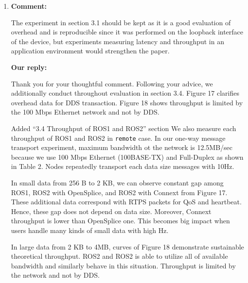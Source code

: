 \documentclass{article}
\begin{document}
\begin{enumerate}
\item \begin{flushleft}
    \textbf{Comment:}
  \end{flushleft}
  The experiment in section 3.1 should be kept as it is a good evaluation of overhead and is reproducible since it was performed on the loopback interface of the device, but experiments measuring latency and throughput in an application environment would strengthen the paper.

  \begin{flushleft}
    \textbf{Our reply:}
  \end{flushleft}
  Thank you for your thoughtful comment. 
  Following your advice, we additionally conduct throughout evaluation in section 3.4.
  Figure 17 clarifies overhead data for DDS transaction.
  Figure 18 shows throughput is limited by the 100 Mbps Ethernet network and not by DDS.
  \begin{itembox}[|]{Added ``3.4 Throughput of ROS1 and ROS2'' section}
    We also measure each throughput of ROS1 and ROS2 in \texttt{remote} case.
    In our one-way message transport experiment, maximum bandwidth ot the network is 12.5MB/sec because we use 100 Mbps Ethernet (100BASE-TX) and Full-Duplex as shown in Table 2.
    Nodes repeatedly transport each data size messages with 10Hz.

    In small data from 256 B to 2 KB, we can observe constant gap among ROS1, ROS2 with OpenSplice, and ROS2 with Connext from Figure 17.
    These additional data correspond with RTPS packets for QoS and heartbeat.
    Hence, these gap does not depend on data size.
    Moreover, Connext throughput is lower than OpenSplice one.
    This becomes big impact when users handle many kinds of small data with high Hz.

    In large data from 2 KB to 4MB, curves of Figure 18 demonstrate sustainable theoretical throughput.
    ROS2 and ROS2 is able to utilize all of available bandwidth and similarly behave in this situation.
    Throughput is limited by the network and not by DDS.
  \end{itembox}\\
  
\end{enumerate}
\end{document}
